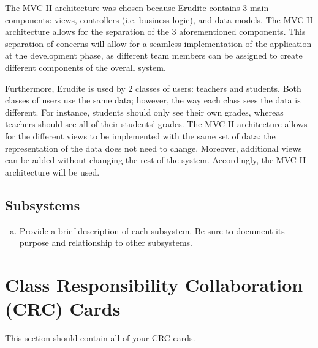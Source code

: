 \documentclass[]{article}
\begin{document}
The MVC-II architecture was chosen because Erudite contains 3 main components: views, controllers (i.e. business logic), and data models. The MVC-II architecture allows for the separation of the 3 aforementioned components. This separation of concerns will allow for a seamless implementation of the application at the development phase, as different team members can be assigned to create different components of the overall system.

Furthermore, Erudite is used by 2 classes of users: teachers and students. Both classes of users use the same data; however, the way each class sees the data is different. For instance, students should only see their own grades, whereas teachers should see all of their students' grades. The MVC-II architecture allows for the different views to be implemented with the same set of data: the representation of the data does not need to change.  Moreover, additional views can be added without changing the rest of the system. Accordingly, the MVC-II architecture will be used.


\subsection{Subsystems}
\label{sub:subsystems}
\begin{enumerate}[a)]
	\item Provide a brief description of each subsystem. Be sure to document its
purpose and relationship to other subsystems.
\end{enumerate}


\section{Class Responsibility Collaboration (CRC) Cards}
\label{sec:class_responsibility_collaboration_crc_cards}
This section should contain all of your CRC cards.
\end{document}
